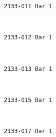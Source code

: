 \documentclass[11pt]{article}
\begin{document}
    \begin{Verbatim}[commandchars=\\\{\}]
2133-011 Bar 1

    \end{Verbatim}

    \begin{center}
    \end{center}
    { \hspace*{\fill} \\}
    
    \begin{Verbatim}[commandchars=\\\{\}]
2133-012 Bar 1

    \end{Verbatim}

    \begin{center}
    \end{center}
    { \hspace*{\fill} \\}
    
    \begin{Verbatim}[commandchars=\\\{\}]
2133-013 Bar 1

    \end{Verbatim}

    \begin{center}
    \end{center}
    { \hspace*{\fill} \\}
    
    \begin{Verbatim}[commandchars=\\\{\}]
2133-015 Bar 1

    \end{Verbatim}

    \begin{center}
    \end{center}
    { \hspace*{\fill} \\}
    
    \begin{Verbatim}[commandchars=\\\{\}]
2133-017 Bar 1

    \end{Verbatim}
\end{document}
